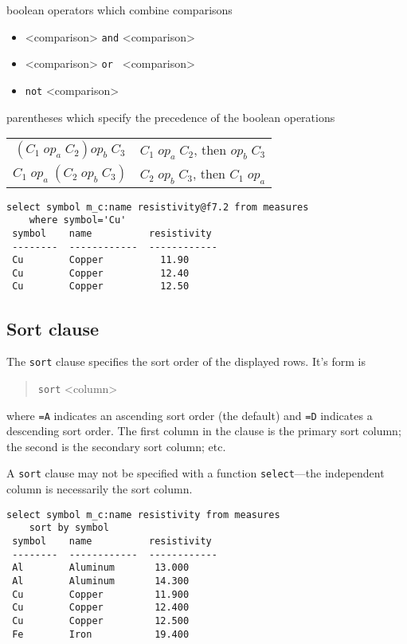 \documentclass[11pt,a4paper]{report}
\begin{document}
\begin{List}
 \item[boolean operators] which combine comparisons
 \begin{itemize}
  \item <comparison> \verb!and! <comparison> 
  \item <comparison> \verb!or ! <comparison>
  \item \phantom{<comparison>} \verb!not! <comparison>
  \end{itemize}
 
 \item[parentheses] which specify the precedence
   of the boolean operations
 
     \begin{tabular}{cl}
     $(C_1\; op_a\; C_2) op_b\; C_3$&
        $C_1\; op_a\; C_2$, then $ op_b\; C_3$\\
     $C_1\; op_a\; (C_2\; op_b\; C_3)$&
        $C_2\; op_b\; C_3$, then $ C_1\; op_a$
     \end{tabular}
\end{List}

\begin{verbatim}
select symbol m_c:name resistivity@f7.2 from measures
    where symbol='Cu'
 symbol    name          resistivity
 --------  ------------  ------------
 Cu        Copper          11.90
 Cu        Copper          12.40
 Cu        Copper          12.50
\end{verbatim}
 
\subsection{Sort clause}
%
\label{sort-clause}
The \verb!sort! clause specifies the sort order of the displayed
rows.
It's form is
\begin{verse}
\verb!sort! 
  <column>  \opt{\ldots}
\end{verse}
where \verb!=A! indicates an ascending sort order (the default)
and \verb!=D! indicates a descending sort order.
The first column in the clause is the primary sort column;
the second is the secondary sort column; etc.
 
A \verb!sort! clause may not be specified with a function \verb!select!---the
independent column is necessarily the sort column.
 
\begin{verbatim}
select symbol m_c:name resistivity from measures
    sort by symbol
 symbol    name          resistivity
 --------  ------------  ------------
 Al        Aluminum       13.000
 Al        Aluminum       14.300
 Cu        Copper         11.900
 Cu        Copper         12.400
 Cu        Copper         12.500
 Fe        Iron           19.400
\end{verbatim}
 
\end{document}
